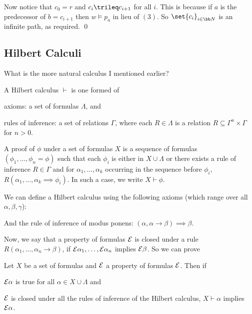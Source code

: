 Now notice that $c_0=r$ and $c_i\trileq c_{i+1}$ for all $i$.
This is because if $a$ is the predecessor of $b=c_{i+1}$ then $w\vDash p_a$ in lieu of $(3)$.
So $\set{c_i}_{i\in{\bb N}}$ is an infinite path, as required.
\qed

\subsection{Hilbert Calculi}

What is the more natural calculus I mentioned earlier?

\bdefn

    A {\emphcolor Hilbert calculus} $\vdash$ is one formed of
    \benum
        \item {\emphcolor axioms}: a set of formulas $\Lambda$, and
        \item {\emphcolor rules of inference}: a set of relations $\Gamma$, where each
        $R\in\Lambda$ is a relation $R\subseteq\Gamma^n\times\Gamma$ for $n>0$.
    \eenum

    A {\emphcolor proof} of $\phi$ under a set of formulas $X$ is a sequence of formulas
    $(\phi_1,\dots,\phi_n=\phi)$ such that each $\phi_i$ is either in $X\cup\Lambda$ or there
    exists a rule of inference $R\in\Gamma$ and for $\alpha_1,\dots,\alpha_k$ occurring in the
    sequence before $\phi_i$, $R(\alpha_1,\dots,\alpha_k\implies\phi_i)$.
    In such a case, we write $X\vdash\phi$.

\edefn

We can define a Hilbert calculus using the following axioms (which range over all
$\alpha,\beta,\gamma$):

\medskip
\centerline{\vbox{\jot{}}}
\medskip

And the rule of inference of modus ponens: $(\alpha,\alpha\to\beta)\implies\beta$.

Now, we say that a property of formulas ${\cal E}$ is closed under a rule
$R(\alpha_1,\dots,\alpha_n\to\beta)$, if ${\cal E}\alpha_1,\dots,{\cal E}\alpha_n$ implies ${\cal E}\beta$.
So we can prove

\blemm[title=Principle of Induction for Hilbert Calculi]

    Let $X$ be a set of formulas and ${\cal E}$ a property of formulas ${\cal E}$.
    Then if
    \benum
        \item ${\cal E}\alpha$ is true for all $\alpha\in X\cup\Lambda$ and
        \item ${\cal E}$ is closed under all the rules of inference of the Hilbert calculus,
    \eenum
    $X\vdash\alpha$ implies ${\cal E}\alpha$.

